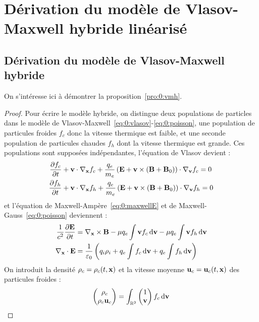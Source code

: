 \section{Dérivation du modèle de Vlasov-Maxwell hybride linéarisé}

\subsection{Dérivation du modèle de Vlasov-Maxwell hybride}
\label{ssec:0:vmh}

On s'intéresse ici à démontrer la proposition~\ref{pro:0:vmh}.
\begin{proof}
  Pour écrire le modèle hybride, on distingue deux populations de particles dans le modèle de Vlasov-Maxwell~\eqref{eq:0:vlasov}-\eqref{eq:0:poisson}, une population de particules froides $f_c$ donc la vitesse thermique est faible, et une seconde population de particules chaudes $f_h$ dont la vitesse thermique est grande. Ces populations sont supposées indépendantes, l'équation de Vlasov devient :
  $$
    \begin{aligned}
      \pdv{f_c}{t} &+ \vb{v}\cdot\nabla_{\vb{x}} f_c + \frac{q_e}{m_e}\left( \vb{E} + \vb{v}\times(\vb{B}+\vb{B}_0) \right)\cdot\nabla_{\vb{v}} f_c = 0 \\
      \pdv{f_h}{t} &+ \vb{v}\cdot\nabla_{\vb{x}} f_h + \frac{q_e}{m_e}\left( \vb{E} + \vb{v}\times(\vb{B}+\vb{B}_0) \right)\cdot\nabla_{\vb{v}} f_h = 0
    \end{aligned}
  $$
  et l'équation de Maxwell-Ampère~\eqref{eq:0:maxwellE} et de Maxwell-Gauss~\eqref{eq:0:poisson} deviennent :
  $$
    \begin{aligned}
      \frac{1}{c^2}\pdv{\vb{E}}{t} &= \nabla_{\vb{x}}\times \vb{B} - \mu q_e\int \vb{v} f_c\dd{\vb{v}} - \mu q_e\int \vb{v} f_h\dd{\vb{v}} \\
      \nabla_{\vb{x}}\cdot\vb{E} &= \frac{1}{\varepsilon_0}\left( q_i\rho_i + q_e\int f_c\dd{\vb{v}} + q_e\int f_h\dd{\vb{v}} \right)
    \end{aligned}
  $$
  On introduit la densité $\rho_c=\rho_c(t,\vb{x})$ et la vitesse moyenne $\vb{u}_c=\vb{u}_c(t,\vb{x})$ des particules froides :
  $$
    \begin{pmatrix}
      \rho_c \\
      \rho_c \vb{u}_c
    \end{pmatrix}
    =
    \int_{\mathbb{R}^3} \begin{pmatrix}
      1 \\
      \vb{v}
    \end{pmatrix} f_c\dd{\vb{v}}
$$
\end{proof}
